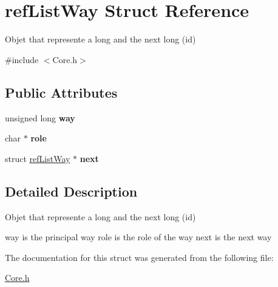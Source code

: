 \hypertarget{structrefListWay}{\section{ref\-List\-Way Struct Reference}
\label{structrefListWay}
}


Objet that represente a long and the next long (id)  




{\ttfamily \#include $<$Core.\-h$>$}

\subsection*{Public Attributes}
\begin{DoxyCompactItemize}
\item 
\hypertarget{structrefListWay_ab4efd61c3ba5bfd6a68aec29ae9ffef0}{unsigned long {\bfseries way}}\label{structrefListWay_ab4efd61c3ba5bfd6a68aec29ae9ffef0}

\item 
\hypertarget{structrefListWay_a1a091291a89a5f54ba76b4e4bdcbe7b1}{char $\ast$ {\bfseries role}}\label{structrefListWay_a1a091291a89a5f54ba76b4e4bdcbe7b1}

\item 
\hypertarget{structrefListWay_aa0b05de016593f1b96812a8ba93fe9ff}{struct \hyperlink{structrefListWay}{ref\-List\-Way} $\ast$ {\bfseries next}}\label{structrefListWay_aa0b05de016593f1b96812a8ba93fe9ff}

\end{DoxyCompactItemize}


\subsection{Detailed Description}
Objet that represente a long and the next long (id) 

way is the principal way role is the role of the way next is the next way 

The documentation for this struct was generated from the following file\-:\begin{DoxyCompactItemize}
\item 
\hyperlink{Core_8h}{Core.\-h}\end{DoxyCompactItemize}
